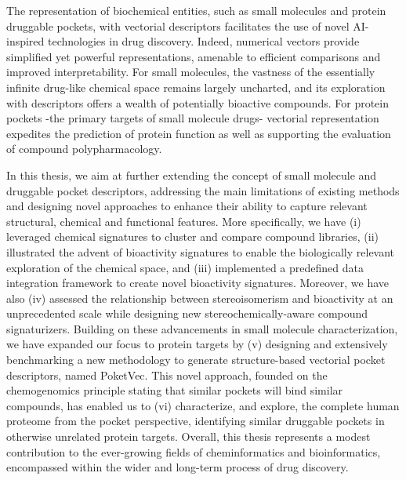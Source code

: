 
The representation of biochemical entities, such as small molecules and protein druggable pockets, with vectorial descriptors facilitates the use of novel AI-inspired technologies in drug discovery. Indeed, numerical vectors provide simplified yet powerful representations, amenable to efficient comparisons and improved interpretability. For small molecules, the vastness of the essentially infinite drug-like chemical space remains largely uncharted, and its exploration with descriptors offers a wealth of potentially bioactive compounds. For protein pockets -the primary targets of small molecule drugs- vectorial representation expedites the prediction of protein function as well as supporting the evaluation of compound polypharmacology.  

In this thesis, we aim at further extending the concept of small molecule and druggable pocket descriptors, addressing the main limitations of existing methods and designing novel approaches to enhance their ability to capture relevant structural, chemical and functional features. More specifically, we have (i) leveraged chemical signatures to cluster and compare compound libraries, (ii) illustrated the advent of bioactivity signatures to enable the biologically relevant exploration of the chemical space, and (iii) implemented a predefined data integration framework to create novel bioactivity signatures. Moreover, we have also (iv) assessed the relationship between stereoisomerism and bioactivity at an unprecedented scale while designing new stereochemically-aware compound signaturizers. Building on these advancements in small molecule characterization, we have expanded our focus to protein targets by (v) designing and extensively benchmarking a new methodology to generate structure-based vectorial pocket descriptors, named PoketVec. This novel approach, founded on the chemogenomics principle stating that similar pockets will bind similar compounds, has enabled us to (vi) characterize, and explore, the complete human proteome from the pocket perspective, identifying similar druggable pockets in otherwise unrelated protein targets. Overall, this thesis represents a modest contribution to the ever-growing fields of cheminformatics and bioinformatics, encompassed within the wider and long-term process of drug discovery. 